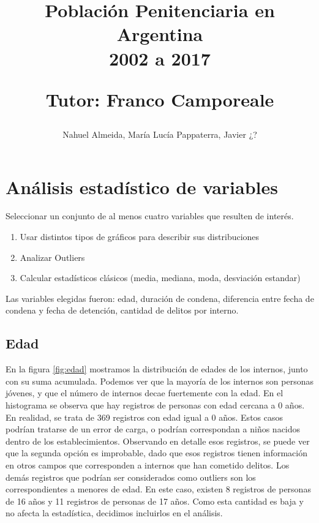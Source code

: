 \documentclass[10pt]{article}
\begin{document}
	
\title{Población Penitenciaria en Argentina\\ 2002 a 2017 \\
	\begin{small}
		Tutor: Franco Camporeale
	\end{small}}
\author{\small{Nahuel Almeida, María Lucía Pappaterra, Javier ¿?}}

\maketitle

\section{Análisis estadístico de variables}

Seleccionar un conjunto de al menos cuatro variables que resulten de interés.

\begin{enumerate}
	\item Usar distintos tipos de gráficos para describir sus distribuciones
	\item Analizar Outliers
	\item Calcular estadísticos clásicos (media, mediana, moda, desviación estandar)
\end{enumerate}

Las variables elegidas fueron: edad, duración de condena, diferencia entre fecha de condena y fecha de detención, cantidad de delitos por interno.

\subsection{Edad}

En la figura \ref{fig:edad} mostramos la distribuci\'on de edades de los internos, junto con su suma acumulada. Podemos ver que la mayor\'ia de los internos son personas j\'ovenes, y que el n\'umero de internos decae fuertemente con la edad. En el histograma se observa que hay registros de personas con edad cercana a 0 años. En realidad, se trata de 369 registros con edad igual a 0 años. Estos casos podr\'ian tratarse de un error de carga, o podr\'ian correspondan a ni\~nos nacidos dentro de los establecimientos. Observando en detalle esos registros, se puede ver que la segunda opci\'on es improbable, dado que esos registros tienen informaci\'on en otros campos que corresponden a internos que han cometido delitos.  Los dem\'as registros que podr\'ian ser considerados como outliers son los correspondientes a menores de edad. En este caso, existen 8 registros de personas de 16 a\~nos y 11 registros de personas de 17 a\~nos. Como esta cantidad es baja y no afecta la estad\'istica, decidimos incluirlos en el an\'alisis.
\end{document}
